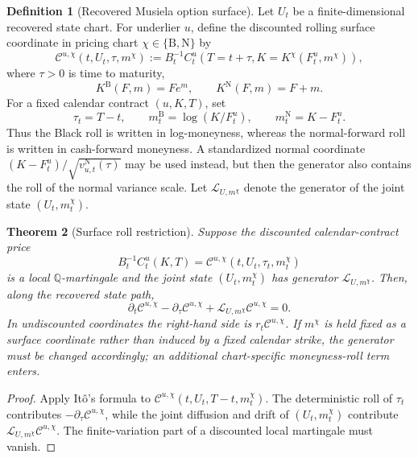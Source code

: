 \documentclass[11pt,a4paper]{amsart}
\theoremstyle{plain}
\newtheorem{theorem}{Theorem}[section]
\theoremstyle{definition}
\newtheorem{definition}[theorem]{Definition}
\theoremstyle{remark}
\newcommand{\QQ}{\mathbb{Q}}
\begin{document}
\begin{definition}[Recovered Musiela option surface]\label{def:recovered-musiela-surface}
Let \(U_t\) be a finite-dimensional recovered state chart.  For underlier \(u\), define the
discounted rolling surface coordinate in pricing chart \(\chi\in\{\mathrm B,\mathrm N\}\) by
\[
        \mathcal C^{u,\chi}(t,U_t,\tau,m^\chi)
        :=
        B_t^{-1}C_t^u(T=t+\tau,K=K^\chi(F_t^u,m^\chi)),
\]
where \(\tau>0\) is time to maturity,
\[
        K^{\mathrm B}(F,m)=Fe^m,\qquad K^{\mathrm N}(F,m)=F+m .
\]
For a fixed calendar contract \((u,K,T)\), set
\[
        \tau_t=T-t,\qquad
        m_t^{\mathrm B}=\log(K/F_t^u),
        \qquad
        m_t^{\mathrm N}=K-F_t^u .
\]
Thus the Black roll is written in log-moneyness, whereas the normal-forward roll is written in
cash-forward moneyness.  A standardized normal coordinate
\((K-F_t^u)/\sqrt{v_{u,t}^{\mathrm N}(\tau)}\) may be used instead, but then the generator also
contains the roll of the normal variance scale.
Let \(\mathcal L_{U,m^\chi}\) denote the generator of the joint state
\((U_t,m_t^\chi)\).
\end{definition}

\begin{theorem}[Surface roll restriction]\label{thm:surface-roll-restriction}
Suppose the discounted calendar-contract price
\[
        B_t^{-1}C_t^u(K,T)
        =
        \mathcal C^{u,\chi}(t,U_t,\tau_t,m_t^\chi)
\]
is a local \(\QQ\)-martingale and the joint state \((U_t,m_t^\chi)\) has generator
\(\mathcal L_{U,m^\chi}\).  Then, along the recovered state path,
\[
        \partial_t\mathcal C^{u,\chi}
        -
        \partial_\tau\mathcal C^{u,\chi}
        +
        \mathcal L_{U,m^\chi}\mathcal C^{u,\chi}
        =
        0 .
\]
In undiscounted coordinates the right-hand side is \(r_t\mathcal C^{u,\chi}\).  If
\(m^\chi\) is held fixed as a surface coordinate rather than induced by a fixed calendar strike,
the generator must be changed accordingly; an additional chart-specific moneyness-roll term
enters.
\end{theorem}

\begin{proof}
Apply It\^o's formula to
\(\mathcal C^{u,\chi}(t,U_t,T-t,m_t^\chi)\).  The deterministic roll of \(\tau_t\) contributes
\(-\partial_\tau\mathcal C^{u,\chi}\), while the joint diffusion and drift of
\((U_t,m_t^\chi)\) contribute
\(\mathcal L_{U,m^\chi}\mathcal C^{u,\chi}\).  The finite-variation part of a discounted local
martingale must vanish.
\end{proof}
\end{document}
